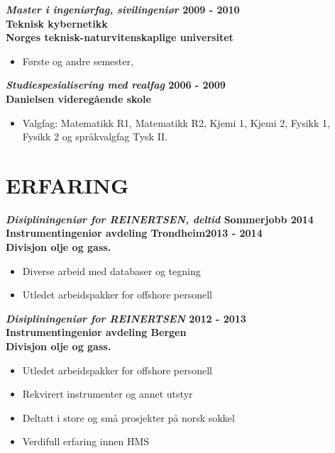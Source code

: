 \documentclass[margin, 10pt, norsk]{res} %
\begin{document}
\begin{resume}
\textbf{\emph{Master i ingeniørfag, sivilingeniør} \hfill 2009 - 2010
\\Teknisk kybernetikk  \\
Norges teknisk-naturvitenskaplige universitet} 
\begin{itemize} \itemsep -2pt %
\item Første og andre semester,
\end{itemize}

\textbf{\emph{Studiespesialisering med realfag }\hfill 2006 - 2009\\
Danielsen videregående skole}
\begin{itemize} \itemsep -2pt %
\item Valgfag: Matematikk R1, Matematikk R2, Kjemi 1, Kjemi 2, Fysikk 1,\\Fysikk 2 og språkvalgfag Tysk II.
\end{itemize}

 
\hspace{5mm}  

\section{ERFARING}

\textbf{\emph{Disipliningeniør for REINERTSEN, deltid} \hfill Sommerjobb 2014\\
Instrumentingeniør avdeling Trondheim\hfill 2013 - 2014\\
Divisjon olje og gass.}

\begin{itemize} \itemsep -2pt %
\item Diverse arbeid med databaser og tegning
\item Utledet arbeidspakker for offshore personell 
\end{itemize}

\textbf{\emph{Disipliningeniør for REINERTSEN} \hfill 2012 - 2013 \\
Instrumentingeniør avdeling Bergen\\
Divisjon olje og gass.}
\begin{itemize} \itemsep -2pt %
\item Utledet arbeidspakker for offshore personell 
\item Rekvirert instrumenter og annet utstyr
\item Deltatt i store og små prosjekter på norsk sokkel
\item Verdifull erfaring innen HMS
\end{itemize}
 

\end{resume}
\end{document}
